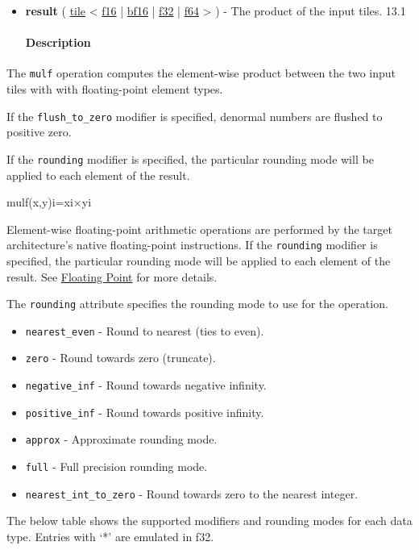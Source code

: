 \documentclass{article}
\begin{document}
\begin{itemize}
\item \textbf{result} ( \href{https://docs.nvidia.com/cuda/tile-ir/latest/sections/types.html#type-tile}{tile} < \href{https://docs.nvidia.com/cuda/tile-ir/latest/sections/types.html#subsection-element-types}{f16} | \href{https://docs.nvidia.com/cuda/tile-ir/latest/sections/types.html#subsection-element-types}{bf16} | \href{https://docs.nvidia.com/cuda/tile-ir/latest/sections/types.html#subsection-element-types}{f32} | \href{https://docs.nvidia.com/cuda/tile-ir/latest/sections/types.html#subsection-element-types}{f64} > ) - The product of the input tiles. 13.1


\paragraph{Description}

\end{itemize}
The \texttt{mulf} operation computes the element-wise product between the two input tiles with with floating-point element types.


If the \texttt{flush\_to\_zero} modifier is specified, denormal numbers are flushed to positive zero.


If the \texttt{rounding} modifier is specified, the particular rounding mode will be applied to each element of the result.


mulf(x,y)i=xi×yi

Element-wise floating-point arithmetic operations are performed by the target architecture's native floating-point instructions. If the \texttt{rounding} modifier is specified, the particular rounding mode will be applied to each element of the result. See \href{https://docs.nvidia.com/cuda/tile-ir/latest/sections/operations.html#op-group-floating-point}{Floating Point} for more details.


The \texttt{rounding} attribute specifies the rounding mode to use for the operation.


\begin{itemize}
\item \texttt{nearest\_even} - Round to nearest (ties to even).
\item \texttt{zero} - Round towards zero (truncate).
\item \texttt{negative\_inf} - Round towards negative infinity.
\item \texttt{positive\_inf} - Round towards positive infinity.
\item \texttt{approx} - Approximate rounding mode.
\item \texttt{full} - Full precision rounding mode.
\item \texttt{nearest\_int\_to\_zero} - Round towards zero to the nearest integer.

\end{itemize}
The below table shows the supported modifiers and rounding modes for each data type. Entries with `*' are emulated in f32.
\end{document}
